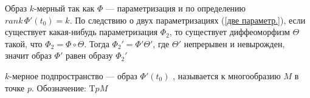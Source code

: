 \begin{prf}
	Образ $k$-мерный так как $\varPhi$ --- параметризация и по определению $rank\, \varPhi'(t_0) = k$. По следствию о двух параметризациях (\ref{две параметр.}), если существует какая-нибудь параметризация $\varPhi_2$, то существует диффеоморфизм $\Theta$ такой, что $\varPhi_2 = \varPhi \circ \Theta$. Тогда $\varPhi_2' = \varPhi' \Theta'$, где $\Theta'$ непрерывен и невырожден, значит образ $\varPhi'$ равен образу $\varPhi_2'$ 
\end{prf}

\begin{opr}
	$k$-мерное подпространство --- образ $\varPhi'(t_0)$ , называется   к многообразию $M$ в точке $p$. Обозначение: $\mathrm TpM$
\end{opr}


